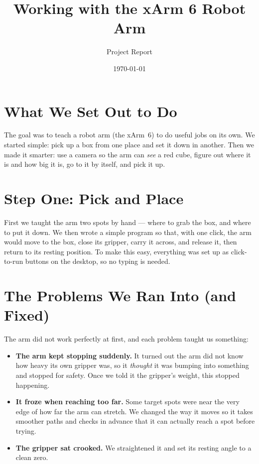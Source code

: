 \documentclass[11pt]{article}
\title{\vspace{-1.5cm}\textbf{Working with the xArm 6 Robot Arm}}
\author{Project Report}
\date{\today}
\begin{document}
\maketitle
\vspace{-0.8cm}

\section*{What We Set Out to Do}

The goal was to teach a robot arm (the xArm~6) to do useful jobs on its own.
We started simple: pick up a box from one place and set it down in another.
Then we made it smarter: use a camera so the arm can \emph{see} a red cube,
figure out where it is and how big it is, go to it by itself, and pick it up.

\section*{Step One: Pick and Place}

First we taught the arm two spots by hand --- where to grab the box, and where
to put it down. We then wrote a simple program so that, with one click, the arm
would move to the box, close its gripper, carry it across, and release it, then
return to its resting position. To make this easy, everything was set up as
click-to-run buttons on the desktop, so no typing is needed.

\section*{The Problems We Ran Into (and Fixed)}

The arm did not work perfectly at first, and each problem taught us something:

\begin{itemize}
  \item \textbf{The arm kept stopping suddenly.} It turned out the arm did not
        know how heavy its own gripper was, so it \emph{thought} it was bumping
        into something and stopped for safety. Once we told it the gripper's
        weight, this stopped happening.
  \item \textbf{It froze when reaching too far.} Some target spots were near the
        very edge of how far the arm can stretch. We changed the way it moves so
        it takes smoother paths and checks in advance that it can actually reach
        a spot before trying.
  \item \textbf{The gripper sat crooked.} We straightened it and set its
        resting angle to a clean zero.
\end{itemize}
\end{document}

